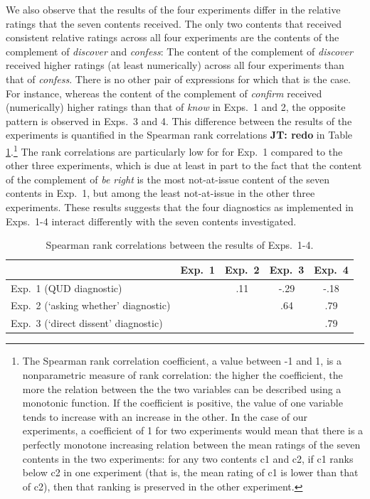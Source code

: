 \documentclass[times,linguex,xcolor]{glossa}
\begin{document}
  We also observe that the results of the four experiments differ in the relative ratings that the seven contents received. The only two contents that received consistent relative ratings across all four experiments are the contents of the complement of \emph{discover} and \emph{confess}: The content of the complement of \emph{discover} received higher ratings (at least numerically) across all four experiments than that of \emph{confess}. There is no other pair of expressions for which that is the case. For instance, whereas the content of the complement of \emph{confirm} received (numerically) higher ratings than that of \emph{know} in Exps.~1 and 2, the opposite pattern is observed in Exps.~3 and 4. This difference between the results of the experiments is quantified in the Spearman rank correlations  {\bf JT: redo} in Table \ref{t:spearman}.\footnote{The Spearman rank correlation coefficient, a value between -1 and 1, is a nonparametric measure of rank correlation: the higher the coefficient, the more the relation between the the two variables can be described using a monotonic function. If the coefficient is positive, the value of one variable tends to increase with an increase in the other. In the case of our experiments, a coefficient of 1 for two experiments would mean that there is a perfectly monotone increasing relation between the mean ratings of the seven contents in the two experiments: for any two contents c1 and c2, if c1 ranks below c2 in one experiment (that is, the mean rating of c1 is lower than that of c2), then that ranking is preserved in the other experiment.} The rank correlations are particularly low for for Exp.~1 compared to the other three experiments, which is due at least in part to the fact that the content of the complement of \emph{be right} is the most not-at-issue content of the seven contents in Exp.~1, but among the least not-at-issue in the other three experiments. These results suggests that the four diagnostics as implemented in Exps.~1-4 interact differently with the seven contents investigated.
   
  
   \begin{table}[ht!]
   \centering
   \begin{tabular}{l | c c c c}
   & Exp.~1 & Exp.~2 & Exp.~3 & Exp.~4 \\ \hline
   Exp.~1 (QUD diagnostic) & \cellcolor{lightgray} & .11 & -.29 & -.18 \\
   Exp.~2 (`asking whether' diagnostic) & \cellcolor{lightgray} & \cellcolor{lightgray} & .64 &.79 \\
   Exp.~3 (`direct dissent' diagnostic) & \cellcolor{lightgray}& \cellcolor{lightgray} & \cellcolor{lightgray} & .79  \\
   \hline
   \end{tabular}
   \caption{Spearman rank correlations between the results of Exps.~1-4.}\label{t:spearman}
   \end{table}
  
\end{document}
